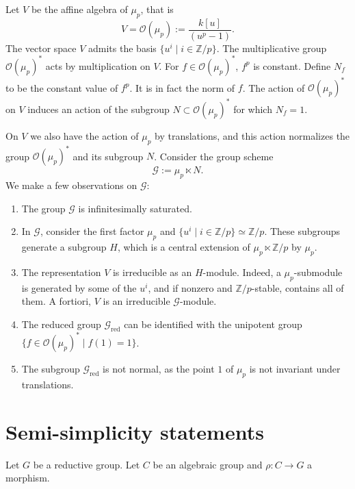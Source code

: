\documentclass[11pt]{article}
\newcommand{\red}{\mathrm{red}}
\begin{document}
Let \(V\) be the affine algebra of \(\mu_p\), that is
\begin{equation}
  V=\mathcal O(\mu_p):=\frac{k[u]}{(u^p-1)}.
  \tag{3.7.1}
\end{equation}
The vector space \(V\) admits the basis \(\{u^i\mid i\in\mathbb Z/p\}\). The
multiplicative group \(\mathcal O(\mu_p)^*\) acts by multiplication on \(V\). For
\(f\in\mathcal O(\mu_p)^*\), \(f^p\) is constant. Define \(N_f\) to be the constant
value of \(f^p\). It is in fact the norm of \(f\). The action of
\(\mathcal O(\mu_p)^*\) on \(V\) induces an action of the subgroup
\(N\subset\mathcal O(\mu_p)^*\) for which \(N_f=1\).

On \(V\) we also have the action of \(\mu_p\) by translations, and this action normalizes
the group \(\mathcal O(\mu_p)^*\) and its subgroup \(N\). Consider the group scheme
\begin{equation}
  \mathcal G:=\mu_p\ltimes N.
  \tag{3.7.2}
\end{equation}
We make a few observations on \(\mathcal G\):
\begin{enumerate}[label=(\arabic*),leftmargin=2em]
\item The group \(\mathcal G\) is infinitesimally saturated.
\item In \(\mathcal G\), consider the first factor \(\mu_p\) and
\(\{u^i\mid i\in\mathbb Z/p\}\simeq\mathbb Z/p\). These subgroups generate a subgroup
\(H\), which is a central extension of \(\mu_p\ltimes\mathbb Z/p\) by \(\mu_p\).
\item The representation \(V\) is irreducible as an \(H\)-module. Indeed, a
\(\mu_p\)-submodule is generated by some of the \(u^i\), and if nonzero and
\(\mathbb Z/p\)-stable, contains all of them. A fortiori, \(V\) is an irreducible
\(\mathcal G\)-module.
\item The reduced group \(\mathcal G_{\red}\) can be identified with the unipotent group
\(\{f\in\mathcal O(\mu_p)^*\mid f(1)=1\}\).
\item The subgroup \(\mathcal G_{\red}\) is not normal, as the point \(1\) of \(\mu_p\)
is not invariant under translations.
\end{enumerate}

\section{Semi-simplicity statements}

Let \(G\) be a reductive group. Let \(C\) be an algebraic group and
\(\rho:C\to G\) a morphism.
\end{document}
